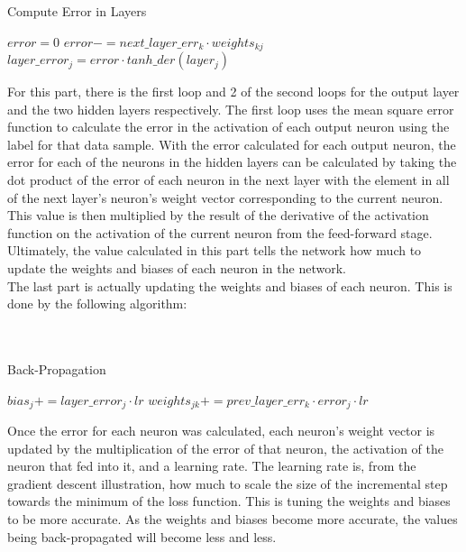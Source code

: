 \documentclass[twoside,twocolumn]{article}
\begin{document}
\begin{algorithm}[h]
\caption{Compute Error in Layers}
\begin{algorithmic}
\State $error=0$
\State $error-=next\_layer\_err_{k}\cdot weights_{kj}$
\EndFor
\State $layer\_error_j = error\cdot tanh\_der(layer_j)$
\EndFor
\end{algorithmic}
\end{algorithm}
For this part, there is the first loop and 2 of the second loops for the output layer and the two hidden layers respectively. The first loop uses the mean square error function to calculate the error in the activation of each output neuron using the label for that data sample. With the error calculated for each output neuron, the error for each of the neurons in the hidden layers can be calculated by taking the dot product of the error of each neuron in the next layer with the element in all of the next layer's neuron's weight vector corresponding to the current neuron. This value is then multiplied by the result of the derivative of the activation function on the activation of the current neuron from the feed-forward stage. Ultimately, the value calculated in this part tells the network how much to update the weights and biases of each neuron in the network.\\

The last part is actually updating the weights and biases of each neuron. This is done by the following algorithm:\\ \\ \\
\begin{algorithm}[h]
\caption{Back-Propagation}
\begin{algorithmic}
\State $bias_j+=layer\_error_j\cdot lr$
\State $weights_{jk}+=prev\_layer\_err_{k}\cdot error_{j}\cdot lr$
\EndFor
\EndFor
\end{algorithmic}
\end{algorithm}

Once the error for each neuron was calculated, each neuron's weight vector is updated by the multiplication of the error of that neuron, the activation of the neuron that fed into it, and a learning rate. The learning rate is, from the gradient descent illustration, how much to scale the size of the incremental step towards the minimum of the loss function. This is tuning the weights and biases to be more accurate. As the weights and biases become more accurate, the values being back-propagated will become less and less.\\ 
\end{document}
